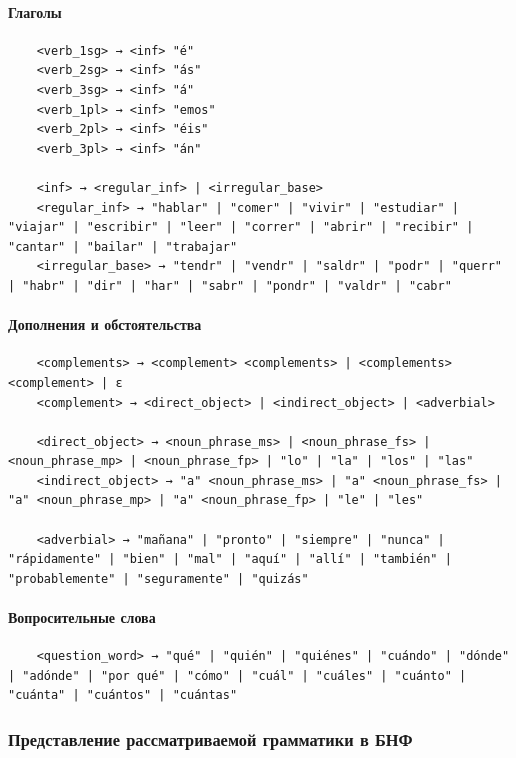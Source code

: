 \documentclass[a4paper,final]{article}
\begin{document}
\paragraph{Глаголы}\mbox{}\par
\begin{lstlisting}
    <verb_1sg> → <inf> "é"
    <verb_2sg> → <inf> "ás"
    <verb_3sg> → <inf> "á"
    <verb_1pl> → <inf> "emos"
    <verb_2pl> → <inf> "éis"
    <verb_3pl> → <inf> "án"
    
    <inf> → <regular_inf> | <irregular_base>
    <regular_inf> → "hablar" | "comer" | "vivir" | "estudiar" | "viajar" | "escribir" | "leer" | "correr" | "abrir" | "recibir" | "cantar" | "bailar" | "trabajar"
    <irregular_base> → "tendr" | "vendr" | "saldr" | "podr" | "querr" | "habr" | "dir" | "har" | "sabr" | "pondr" | "valdr" | "cabr"
\end{lstlisting}

\paragraph{Дополнения и обстоятельства}\mbox{}\par
\begin{lstlisting}
    <complements> → <complement> <complements> | <complements> <complement> | ε
    <complement> → <direct_object> | <indirect_object> | <adverbial>
    
    <direct_object> → <noun_phrase_ms> | <noun_phrase_fs> | <noun_phrase_mp> | <noun_phrase_fp> | "lo" | "la" | "los" | "las"
    <indirect_object> → "a" <noun_phrase_ms> | "a" <noun_phrase_fs> | "a" <noun_phrase_mp> | "a" <noun_phrase_fp> | "le" | "les"
    
    <adverbial> → "mañana" | "pronto" | "siempre" | "nunca" | "rápidamente" | "bien" | "mal" | "aquí" | "allí" | "también" | "probablemente" | "seguramente" | "quizás"
\end{lstlisting}

\paragraph{Вопросительные слова}\mbox{}\par
\begin{lstlisting}
    <question_word> → "qué" | "quién" | "quiénes" | "cuándo" | "dónde" | "adónde" | "por qué" | "cómo" | "cuál" | "cuáles" | "cuánto" | "cuánta" | "cuántos" | "cuántas"
\end{lstlisting}

\subsubsection{Представление рассматриваемой грамматики в БНФ}
\end{document}
